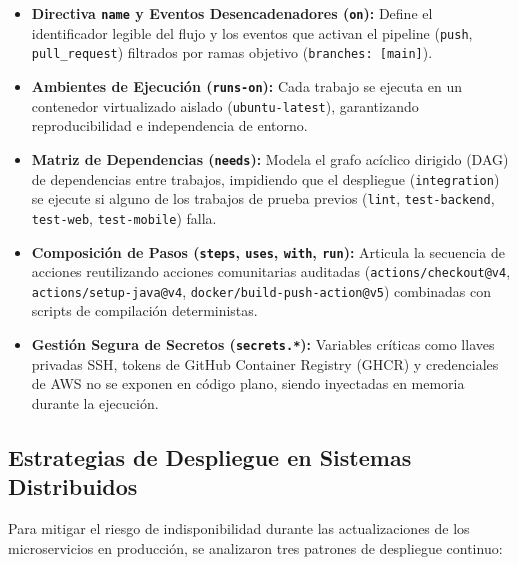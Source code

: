 \documentclass[11pt,a4paper]{article}
\begin{document}
\begin{itemize}[leftmargin=*]
  \item \textbf{Directiva \texttt{name} y Eventos Desencadenadores (\texttt{on}):} Define el identificador legible del flujo y los eventos que activan el pipeline (\texttt{push}, \texttt{pull\_request}) filtrados por ramas objetivo (\texttt{branches: [main]}).
  \item \textbf{Ambientes de Ejecuci\'on (\texttt{runs-on}):} Cada trabajo se ejecuta en un contenedor virtualizado aislado (\texttt{ubuntu-latest}), garantizando reproducibilidad e independencia de entorno.
  \item \textbf{Matriz de Dependencias (\texttt{needs}):} Modela el grafo ac\'iclico dirigido (DAG) de dependencias entre trabajos, impidiendo que el despliegue (\texttt{integration}) se ejecute si alguno de los trabajos de prueba previos (\texttt{lint}, \texttt{test-backend}, \texttt{test-web}, \texttt{test-mobile}) falla.
  \item \textbf{Composici\'on de Pasos (\texttt{steps}, \texttt{uses}, \texttt{with}, \texttt{run}):} Articula la secuencia de acciones reutilizando acciones comunitarias auditadas (\texttt{actions/\allowbreak checkout@v4}, \texttt{actions/\allowbreak setup-java@v4}, \texttt{docker/\allowbreak build-push-action@v5}) combinadas con scripts de compilaci\'on deterministas.
  \item \textbf{Gesti\'on Segura de Secretos (\texttt{secrets.*}):} Variables cr\'iticas como llaves privadas SSH, tokens de GitHub Container Registry (GHCR) y credenciales de AWS no se exponen en c\'odigo plano, siendo inyectadas en memoria durante la ejecuci\'on.
\end{itemize}

\subsection{Estrategias de Despliegue en Sistemas Distribuidos}
\label{subsec:estrategias-despliegue}
Para mitigar el riesgo de indisponibilidad durante las actualizaciones de los microservicios en producci\'on, se analizaron tres patrones de despliegue continuo:
\end{document}
